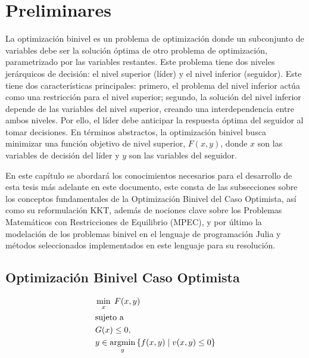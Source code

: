 \chapter{Preliminares}


La optimización binivel es un problema de optimización donde un subconjunto de variables debe ser la solución óptima de otro problema de optimización, parametrizado por las variables restantes. Este problema tiene dos niveles jerárquicos de decisión: el nivel superior (líder) y el nivel inferior (seguidor).
Este tiene dos características principales: primero, el problema del nivel inferior actúa como una restricción para el nivel superior; segundo, la solución del nivel inferior depende de las variables del nivel superior, creando una interdependencia entre ambos niveles. Por ello, el líder debe anticipar la respuesta óptima del seguidor al tomar decisiones.
En términos abstractos, la optimización binivel busca minimizar una función objetivo de nivel superior, $F(x, y)$, donde $x$ son las variables de decisión del líder y $y$ son las variables del seguidor. 

En este capítulo se abordará los conocimientos necesarios para el desarrollo de esta tesis más adelante en este documento, este consta de las subsecciones sobre los conceptos fundamentales de la Optimización Binivel del Caso Optimista, así como su reformulación KKT,
además de nociones clave sobre los Problemas Matemáticos con Restricciones de Equilibrio (MPEC), 
y por último la modelación de los problemas binivel en el lenguaje de programación Julia y métodos seleccionados implementados en este lenguaje para su resolución. 

\section{Optimización Binivel Caso Optimista}

\begin{equation}
\begin{aligned}
& \min_{x} \; F(x, y) \\
& \text{sujeto a } \\
& G(x) \leq 0, \\
& y \in \operatorname*{argmin}_{y} \left\{ f(x, y) \mid v(x, y) \leq 0 \right\}
\end{aligned}
\label{eq:ProblemaGeneral}
\end{equation}

